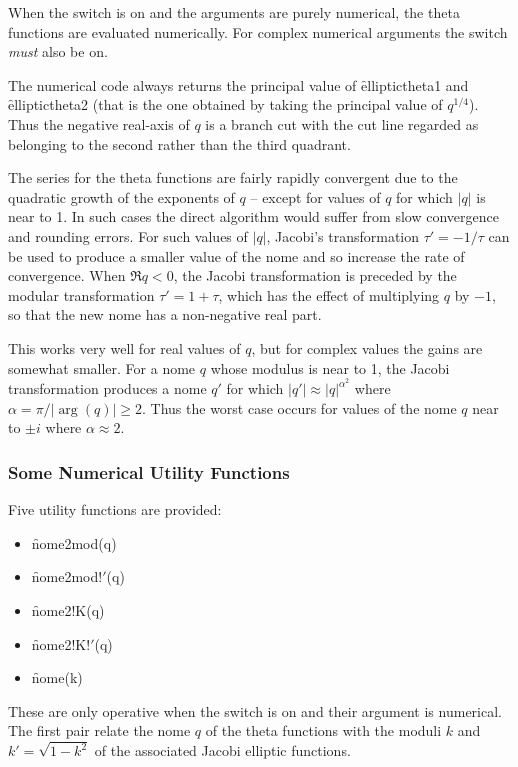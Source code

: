 When the switch  is on and the arguments are purely numerical,
the theta functions are evaluated numerically. For complex numerical arguments
the switch  \emph{must} also be on.

The numerical code always returns the principal value of 
\f{elliptictheta1} and \f{elliptictheta2} (that is the one obtained by
taking the principal value of $q^{1/4}$).
Thus the negative real-axis of $q$ is a branch cut with the cut line
regarded as belonging to the second rather than the third quadrant.

The series for the theta functions are fairly rapidly convergent 
due to the quadratic growth of the exponents of $q$ -- except 
for values of $q$ for which $|q|$ is near to 1.  In such cases the direct
algorithm would suffer from slow convergence and rounding errors.
For such values of $|q|$, Jacobi's transformation $\tau'=-1/\tau$ can be
used to produce a smaller value of the nome and so increase the rate of
convergence.  When $\Re q < 0$, the Jacobi transformation is preceded by the
modular transformation
$\tau' = 1+\tau$, which has the effect  of multiplying $q$ by $-1$, so that 
the new nome has a non-negative real part. 

This works very well for real values of $q$, but for complex
values the gains are somewhat smaller.
For a nome $q$ whose modulus is near to 1, the Jacobi transformation produces a
nome $q'$ for which
$|q'|  \approx  |q|^{\alpha^2}$ where $\alpha =\pi/|\arg(q)| \geq 2$.
Thus the worst case occurs for values of the nome $q$ near to $\pm i$ where 
$\alpha \approx 2$.

\subsubsection{Some Numerical Utility Functions}
\hypertarget{operator:nome}{}
\hypertarget{ELLIPNOME}{}
 

Five utility functions are provided:
\begin{itemize}
\item \f{nome2mod(q)}
\item \f{nome2mod!$'$(q)}
\item \f{nome2!K(q)}
\item \f{nome2!K!$'$(q)}
\item \f{nome(k)}
\end{itemize}

These are only operative when the switch  is on and their
argument is numerical. The first pair relate the nome $q$ of the theta
functions with the moduli $k$ and $k'=\sqrt{1-k^2}$ of the associated Jacobi
elliptic functions.

